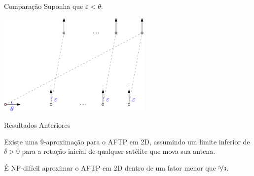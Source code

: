 \begin{frame}{Comparação}
  \centering
  Suponha que $\varepsilon < \theta$:

  \bigskip
  \begin{minipage}{\linewidth}
    \centering
    \includegraphics[height=5cm]{AFTP/makespan.png}
  \end{minipage}

  \bigbreak
  \bigbreak
\end{frame}


\begin{frame}{Resultados Anteriores}
  \begin{thm}
    Existe uma $9$-aproximação para o AFTP em 2D, assumindo um limite inferior de $\delta>0$ para a rotação inicial de qualquer satélite que mova sua antena.
  \end{thm}

  \pause
  \begin{thm}
    É NP-difícil aproximar o AFTP em 2D dentro de um fator menor que $\nicefrac{5}{3}$.
  \end{thm}
\end{frame}
